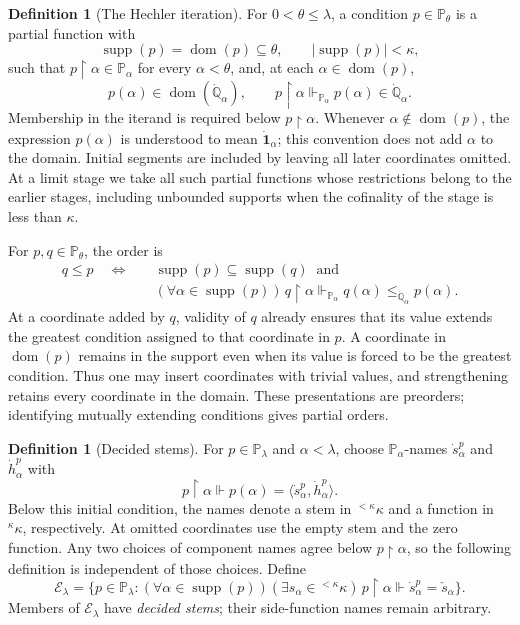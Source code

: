 \documentclass[11pt,a4paper]{amsart}
\theoremstyle{definition}
\newtheorem{definition}[theorem]{Definition}
\theoremstyle{remark}
\newcommand{\PP}{\mathbb P}
\DeclareMathOperator{\dom}{dom}
\DeclareMathOperator{\supp}{supp}
\begin{document}
\begin{definition}[The Hechler iteration]
For \(0<\theta\leq\lambda\), a condition \(p\in\PP_\theta\)
is a partial function with
\[
 \supp(p)=\dom(p)\subseteq\theta,
 \qquad |\supp(p)|<\kappa,
\]
such that \(p\restriction\alpha\in\PP_\alpha\) for every
\(\alpha<\theta\), and, at each \(\alpha\in\dom(p)\),
\[
 p(\alpha)\in\dom(\dot{\mathbb Q}_\alpha),
 \qquad p\restriction\alpha\Vdash_{\PP_\alpha}
                         p(\alpha)\in\dot{\mathbb Q}_\alpha.
\]
Membership in the iterand is required below
\(p\restriction\alpha\).
Whenever \(\alpha\notin\dom(p)\), the expression
\(p(\alpha)\) is understood to mean
\(\dot{\mathbf1}_\alpha\); this convention does not add
\(\alpha\) to the domain. Initial segments are included by
leaving all later coordinates omitted. At a limit stage we
take all such partial functions whose restrictions belong
to the earlier stages, including unbounded supports when
the cofinality of the stage is less than \(\kappa\).

For \(p,q\in\PP_\theta\), the order is
\begin{equation}\label{eq:iteration-order}
 \begin{split}
 q\leq p\quad\Longleftrightarrow\quad&
 \supp(p)\subseteq\supp(q)\ \text{ and}\\
 & (\forall\alpha\in\supp(p))\,
 q\restriction\alpha\Vdash_{\PP_\alpha}
 q(\alpha)\leq_{\dot{\mathbb Q}_\alpha}p(\alpha).
 \end{split}
\end{equation}
At a coordinate added by \(q\), validity of \(q\) already
ensures that its value extends the greatest condition assigned
to that coordinate in \(p\).
A coordinate in \(\dom(p)\) remains in the support even when
its value is forced to be the greatest condition. Thus one may
insert coordinates with trivial values, and strengthening
retains every coordinate in the domain.
These presentations are preorders; identifying mutually extending
conditions gives partial orders.
\end{definition}

\begin{definition}[Decided stems]\label{def:decided-stems}
For \(p\in\PP_\lambda\) and \(\alpha<\lambda\), choose
\(\PP_\alpha\)-names \(\dot s_\alpha^p\) and
\(\dot h_\alpha^p\) with
\[
 p\restriction\alpha\Vdash
 p(\alpha)=\langle\dot s_\alpha^p,\dot h_\alpha^p\rangle.
\]
Below this initial condition, the names denote a stem in
\({}^{<\kappa}\kappa\) and a function in \({}^{\kappa}\kappa\),
respectively. At omitted coordinates use the empty stem and the
zero function. Any two choices of component names agree below
\(p\restriction\alpha\), so the following definition is
independent of those choices.
Define
\[
 \mathcal E_\lambda=
 \{p\in\PP_\lambda:(\forall\alpha\in\supp(p))
   (\exists s_\alpha\in{}^{<\kappa}\kappa)\,
   p\restriction\alpha\Vdash
                   \dot s_\alpha^p=\check s_\alpha\}.
\]
Members of \(\mathcal E_\lambda\) have \emph{decided stems};
their side-function names remain arbitrary.
\end{definition}
\end{document}
